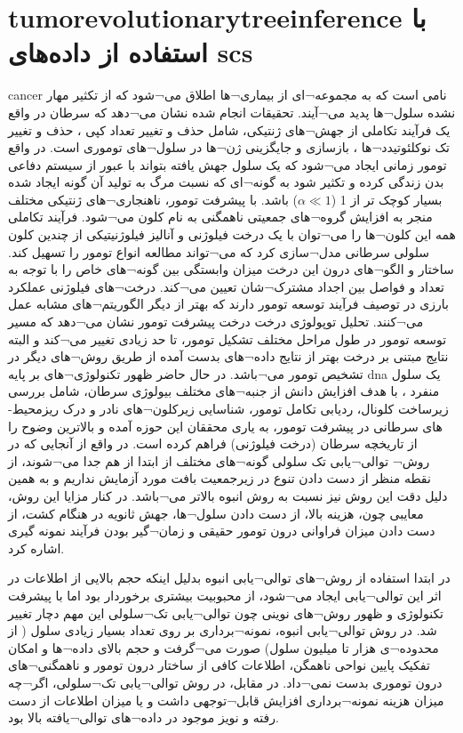\section{\gls{tumorevolutionarytreeinference} با استفاده از داده‌های \gls{scs}}
\gls{cancer} نامی است که به مجموعه¬ای از بیماری¬ها اطلاق می¬شود که از تکثیر مهار نشده سلول¬ها پدید می¬آیند. تحقیقات انجام شده نشان می¬دهد که سرطان در واقع یک فرآیند تکاملی از جهش¬های  ژنتیکی، شامل حذف و تغییر تعداد کپی ، حذف و تغییر تک نوکلئوتیدد¬ها  ، بازسازی و جایگزینی ژن¬ها در سلول¬های توموری است. در واقع تومور زمانی ایجاد می¬شود که یک سلول جهش یافته بتواند با عبور از سیستم دفاعی بدن زندگی کرده و تکثیر شود به گونه¬ای که نسبت مرگ به تولید آن گونه ایجاد شده بسیار کوچک تر از 1   ($\alpha \ll 1$) باشد. با پیشرفت تومور، ناهنجاری¬های ژنتیکی  مختلف منجر به افزایش گروه¬های جمعیتی ناهمگنی به نام کلون  می¬شود. فرآیند تکاملی همه این کلون¬ها را می¬توان با یک درخت فیلوژنی   و آنالیز فیلوژنیتیکی از چندین کلون سلولی سرطانی مدل¬سازی کرد که می¬تواند مطالعه انواع تومور را تسهیل کند. ساختار و الگو¬های درون این درخت میزان وابستگی بین گونه¬های خاص را با توجه به تعداد و فواصل بین اجداد مشترک¬شان تعیین می¬کند. درخت¬های فیلوژنی عملکرد بارزی در توصیف فرآیند توسعه تومور دارند که بهتر از دیگر الگوریتم¬های مشابه عمل می¬کنند. تحلیل توپولوژی درخت درخت پیشرفت تومور نشان می¬دهد که مسیر توسعه تومور در طول مراحل مختلف تشکیل تومور، تا حد زیادی تغییر می¬کند و البته نتایج مبتنی بر درخت بهتر از نتایج داده¬های بدست آمده از طریق روش¬های دیگر در تشخیص تومور می¬باشد.
در حال حاضر ظهور تکنولوژی¬های بر پایه \gls{dna} یک سلول منفرد ، با هدف افزایش دانش از جنبه¬های مختلف بیولوژی سرطان، شامل بررسی زیرساخت کلونال، ردیابی تکامل تومور، شناسایی زیرکلون¬های نادر و درک ریزمحیط-های سرطانی در پیشرفت تومور، به یاری محققان این حوزه آمده و بالاترین وضوح را از تاریخچه سرطان (درخت فیلوژنی) فراهم کرده است. در واقع از آنجایی که در روش¬ توالی¬یابی تک سلولی  گونه¬های مختلف از ابتدا از هم جدا  می¬شوند، از نقطه منظر از دست دادن تنوع در زیرجمعیت بافت مورد آزمایش نداریم و به همین دلیل دقت این روش نیز نسبت به روش انبوه بالاتر می¬باشد. در کنار مزایا این روش، معایبی چون، هزینه بالا، از دست دادن سلول¬ها، جهش ثانویه در هنگام کشت، از دست دادن میزان فراوانی درون تومور حقیقی و زمان¬گیر بودن فرآیند نمونه گیری اشاره کرد.

در ابتدا استفاده از روش¬های توالی¬یابی انبوه  بدلیل اینکه حجم بالایی از اطلاعات در اثر این توالی¬یابی ایجاد می¬شود، از محبوبیت بیشتری برخوردار بود  اما با پیشرفت تکنولوژی و ظهور روش¬های نوینی چون توالی¬یابی تک¬سلولی این مهم دچار تغییر شد. در روش توالی¬یابی انبوه، نمونه¬برداری بر روی تعداد بسیار زیادی سلول ( از محدوده¬ی هزار تا میلیون سلول) صورت می¬گرفت و حجم بالای داده¬ها و امکان تفکیک پایین نواحی ناهمگن، اطلاعات کافی از ساختار درون تومور و ناهمگنی¬های درون توموری بدست نمی¬داد. در مقابل، در روش توالی¬یابی تک¬سلولی، اگر¬چه میزان هزینه نمونه¬برداری افزایش قابل¬توجهی داشت و یا میزان اطلاعات از دست رفته  و نویز موجود در داده¬های توالی¬یافته بالا بود\cite{deshwar2015phylowgs, dean2001rapid}.



